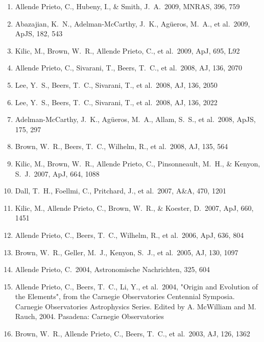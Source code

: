 \documentclass[12pt]{article}
\begin{document}
\begin{enumerate}
\item Allende Prieto, 
C., Hubeny, I., \& Smith, J.~A.\ 2009, MNRAS, 396, 759 


\item Abazajian, K.~N., 
Adelman-McCarthy, J.~K., Ag{\"u}eros, M.~A., et al.\ 2009, ApJS, 182, 543 


\item Kilic, M., Brown, W.~R., 
Allende Prieto, C., et al.\ 2009, ApJ, 695, L92 


\item Allende Prieto, 
C., Sivarani, T., Beers, T.~C., et al.\ 2008, AJ, 136, 2070 


\item Lee, Y.~S., Beers, T.~C., 
Sivarani, T., et al.\ 2008, AJ, 136, 2050 


\item Lee, Y.~S., Beers, T.~C., 
Sivarani, T., et al.\ 2008, AJ, 136, 2022 


\item 
Adelman-McCarthy, J.~K., Ag{\"u}eros, M.~A., Allam, S.~S., et al.\ 2008, 
ApJS, 175, 297 


\item Brown, W.~R., Beers, 
T.~C., Wilhelm, R., et al.\ 2008, AJ, 135, 564 


\item Kilic, M., Brown, W.~R., 
Allende Prieto, C., Pinsonneault, M.~H., 
\& Kenyon, S.~J.\ 2007, ApJ, 664, 1088 


\item Dall, T.~H., Foellmi, C., Pritchard, J., et al.\ 2007, A\&A, 470, 1201 


\item Kilic, M., Allende 
Prieto, C., Brown, W.~R., \& Koester, D.\ 2007, ApJ, 660, 1451 


\item Allende Prieto, 
C., Beers, T.~C., Wilhelm, R., et al.\ 2006, ApJ, 636, 804 


\item Brown, W.~R., Geller, 
M.~J., Kenyon, S.~J., et al.\ 2005, AJ, 130, 1097 


\item Allende Prieto, C.\ 
2004, Astronomische Nachrichten, 325, 604 


\item Allende Prieto, 
C., Beers, T.~C., Li, Y., et al.\ 2004, 
"Origin and Evolution of the Elements", from the Carnegie Observatories Centennial Symposia. Carnegie Observatories Astrophysics Series. Edited by A. McWilliam and M. Rauch, 2004. Pasadena: Carnegie Observatories

\item Brown, W.~R., Allende 
Prieto, C., Beers, T.~C., et al.\ 2003, AJ, 126, 1362 

\end{enumerate}
\end{document}
